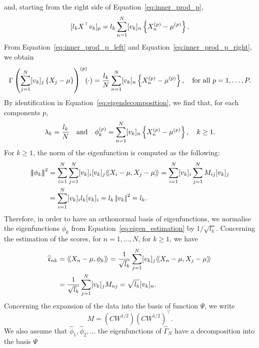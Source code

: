 and, starting from the right side of Equation~\eqref{eq:inner_prod_p},
\begin{equation}\label{eq:inner_prod_p_right}
    [l_k X^\top v_k]_p = l_k \sum_{n = 1}^N [v_{k}]_n \left\{X_n^{(p)} - \mu^{(p)}\right\}.
\end{equation}
From Equation~\eqref{eq:inner_prod_p_left} and Equation~\eqref{eq:inner_prod_p_right}, we obtain
\begin{equation}
    \Gamma\left(\sum_{j = 1}^N [v_{k}]_j \left\{X_j - \mu\right\}\right)^{(p)}\mkern-9mu(\cdot) = \frac{l_k}{N} \sum_{n = 1}^N [v_{k}]_n \left\{X_n^{(p)} - \mu^{(p)}\right\}, \quad\text{for all}~ p = 1, \dots, P.
\end{equation}
By identification in Equation~\eqref{eq:eigendecomposition}, we find that, for each components $p$,
\begin{equation}\label{eq:eigen_estimation}
\lambda_k = \frac{l_k}{N} \quad\text{and}\quad \phi_k^{(p)} = \sum_{n = 1}^N [v_{k}]_n \left\{X_n^{(p)} - \mu^{(p)}\right\}, \quad k \geq 1.
\end{equation}
For $k \geq 1$, the norm of the eigenfunction is computed as the following:
\begin{align*}
\normH{\phi_k}^2 &= \sum_{i = 1}^N \sum_{j = 1}^N [v_{k}]_i [v_{k}]_j\inH{X_i - \mu}{X_j - \mu} = \sum_{i = 1}^N [v_{k}]_i \sum_{j = 1}^N M_{ij} [v_{k}]_j \\
    &= \sum_{i = 1}^N [v_{k}]_i l_k [v_{k}]_i = l_k \normLp{v_k}^2 = l_k. \\
\end{align*}
Therefore, in order to have an orthonormal basis of eigenfunctions, we normalise the eigenfunctions $\phi_k$ from Equation~\eqref{eq:eigen_estimation} by $1 / \sqrt{l_k}$.
Concerning the estimation of the scores, for $n = 1, \dots, N$, for $k \geq 1$, we have
\begin{align}
    \widehat{\mathfrak{c}}_{nk} &= \langle\!\langle X_n - \mu, \phi_k\rangle\!\rangle = \frac{1}{\sqrt{l_k}}\sum_{j = 1}^N [v_{k}]_j \langle\!\langle X_n - \mu, X_j - \mu\rangle\!\rangle\\
    &= \frac{1}{\sqrt{l_k}}\sum_{j = 1}^N [v_{k}]_j M_{nj} = \sqrt{l_k}[v_{k}]_n.\\
\end{align}
Concerning the expansion of the data into the basis of function $\Psi$, we write 
\begin{equation}
    M = \left(CW^{1/2}\right)\left(CW^{1/2}\right)^\top.
\end{equation}
We also assume that $\widehat{\phi}_1, \widehat{\phi}_2, \dots$ the eigenfunctions of $\widehat{\Gamma}_N$ have a decomposition into the basis $\Psi$

